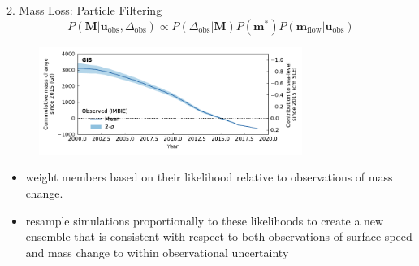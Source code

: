 \documentclass[aspectratio=169,hide notes,intlimits]{beamer}
\begin{document}
\begin{frame}{2. Mass Loss: Particle Filtering}
  \begin{equation*}
    \label{eq:parameter_posterior}
    P(\mathbf{M}|\mathbf{u}_{\mathrm{obs}},\Delta_{\mathrm{obs}}) \propto P(\Delta_{\mathrm{obs}}|\mathbf{M}) P(\mathbf{m}^{*}) P(\mathbf{m}_{\mathrm{flow}}|\mathbf{u}_{\mathrm{obs}})
  \end{equation*}
  \begin{minipage}[t][4cm][t]{\textwidth}
    \begin{figure}
    \includegraphics[height=3.5cm]{GIS_hist_only_obs}
    \end{figure}
  \end{minipage}
  \begin{itemize}
  \item  weight members based on their likelihood relative to observations of mass change.
  \item resample simulations proportionally to these likelihoods to create a new ensemble that is consistent with respect to both  observations of surface speed and mass change to within observational uncertainty
  \end{itemize}
\end{frame}
\end{document}
